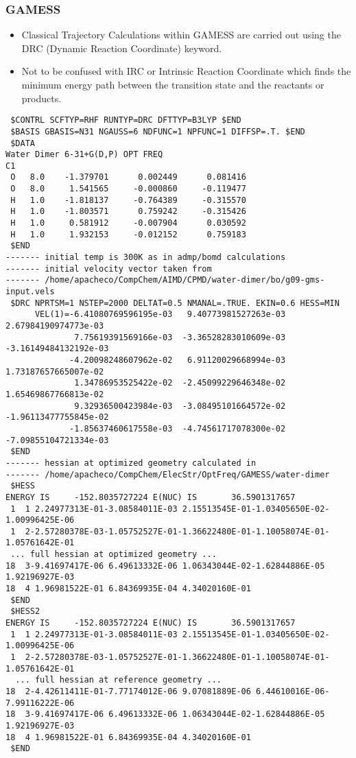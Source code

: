 \documentclass[slidestop,mathserif,compress,xcolor=svgnames]{beamer}
\newenvironment{bblock}[0]
{
\begin{beamerboxesrounded}[upper=uppercol1,lower=lowercol1,shadow=true]}
{\end{beamerboxesrounded}}
\newenvironment{eblock}[0]
{
\begin{beamerboxesrounded}[upper=uppercol2,lower=lowercol2,shadow=true]}
{\end{beamerboxesrounded}}
\begin{document}
\begin{frame}
  \frametitle{\small GAMESS}
  \begin{bblock}{}
    \begin{itemize}
      \item Classical Trajectory Calculations within GAMESS are carried out using the DRC (Dynamic Reaction Coordinate) keyword.
      \item Not to be confused with IRC or Intrinsic Reaction Coordinate which finds the minimum energy path between the transition state and the reactants or products.
    \end{itemize}
  \end{bblock}
  \begin{eblock}{}
    {\fontsize{4}{5}
      \begin{verbatim}
 $CONTRL SCFTYP=RHF RUNTYP=DRC DFTTYP=B3LYP $END
 $BASIS GBASIS=N31 NGAUSS=6 NDFUNC=1 NPFUNC=1 DIFFSP=.T. $END
 $DATA
Water Dimer 6-31+G(D,P) OPT FREQ
C1
 O   8.0    -1.379701      0.002449      0.081416
 O   8.0     1.541565     -0.000860     -0.119477
 H   1.0    -1.818137     -0.764389     -0.315570
 H   1.0    -1.803571      0.759242     -0.315426
 H   1.0     0.581912     -0.007904      0.030592
 H   1.0     1.932153     -0.012152      0.759183
 $END
------- initial temp is 300K as in admp/bomd calculations
------- initial velocity vector taken from 
------- /home/apacheco/CompChem/AIMD/CPMD/water-dimer/bo/g09-gms-input.vels
 $DRC NPRTSM=1 NSTEP=2000 DELTAT=0.5 NMANAL=.TRUE. EKIN=0.6 HESS=MIN
      VEL(1)=-6.41080769596195e-03   9.40773981527263e-03  2.67984190974773e-03 
              7.75619391569166e-03  -3.36528283010609e-03 -3.16149484132192e-03 
             -4.20098248607962e-02   6.91120029668994e-03  1.73187657665007e-02 
              1.34786953525422e-02  -2.45099229646348e-02  1.65469867766813e-02 
              9.32936500423984e-03  -3.08495101664572e-02 -1.96113477755845e-02 
             -1.85637460617558e-03  -4.74561717078300e-02 -7.09855104721334e-03 
 $END 
------- hessian at optimized geometry calculated in
------- /home/apacheco/CompChem/ElecStr/OptFreq/GAMESS/water-dimer
 $HESS
ENERGY IS     -152.8035727224 E(NUC) IS       36.5901317657
 1  1 2.24977313E-01-3.08584011E-03 2.15513545E-01-1.03405650E-02-1.00996425E-06
 1  2-2.57280378E-03-1.05752527E-01-1.36622480E-01-1.10058074E-01-1.05761642E-01
 ... full hessian at optimized geometry ...
18  3-9.41697417E-06 6.49613332E-06 1.06343044E-02-1.62844886E-05 1.92196927E-03
18  4 1.96981522E-01 6.84369935E-04 4.34020160E-01
 $END
 $HESS2
ENERGY IS     -152.8035727224 E(NUC) IS       36.5901317657
 1  1 2.24977313E-01-3.08584011E-03 2.15513545E-01-1.03405650E-02-1.00996425E-06
 1  2-2.57280378E-03-1.05752527E-01-1.36622480E-01-1.10058074E-01-1.05761642E-01
  ... full hessian at reference geometry ...
18  2-4.42611411E-01-7.77174012E-06 9.07081889E-06 6.44610016E-06-7.99116222E-06
18  3-9.41697417E-06 6.49613332E-06 1.06343044E-02-1.62844886E-05 1.92196927E-03
18  4 1.96981522E-01 6.84369935E-04 4.34020160E-01
 $END
      \end{verbatim}
    }
  \end{eblock}
\end{frame}
\end{document}
